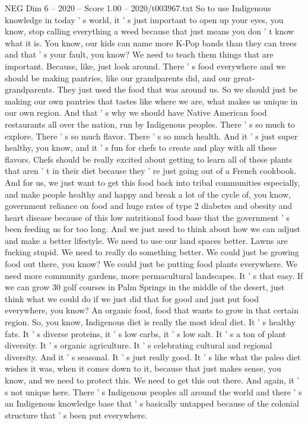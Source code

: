 \begin{textsample}{NEG Dim 6 – 2020 – Score 1.00 – 2020/t003967.txt}
So to use Indigenous knowledge in today ' s world, it ' s just important to open up your eyes, you know, stop calling everything a weed because that just means you don ' t know what it is.
You know, our kids can name more K-Pop bands than they can trees and that ' s your fault, you know?
We need to teach them things that are important.
Because, like, just look around.
There ' s food everywhere and we should be making pantries, like our grandparents did, and our great-grandparents.
They just used the food that was around us.
So we should just be making our own pantries that tastes like where we are, what makes us unique in our own region.
And that ' s why we should have Native American food restaurants all over the nation, run by Indigenous peoples.
There ' s so much to explore.
There ' s so much flavor.
There ' s so much health.
And it ' s just super healthy, you know, and it ' s fun for chefs to create and play with all these flavors.
Chefs should be really excited about getting to learn all of these plants that aren ' t in their diet because they ' re just going out of a French cookbook.
And for us, we just want to get this food back into tribal communities especially, and make people healthy and happy and break a lot of the cycle of, you know, government reliance on food and huge rates of type 2 diabetes and obesity and heart disease because of this low nutritional food base that the government ' s been feeding us for too long.
And we just need to think about how we can adjust and make a better lifestyle.
We need to use our land spaces better.
Lawns are fucking stupid.
We need to really do something better.
We could just be growing food out there, you know?
We could just be putting food plants everywhere.
We need more community gardens, more permacultural landscapes.
It ' s that easy.
If we can grow 30 golf courses in Palm Springs in the middle of the desert, just think what we could do if we just did that for good and just put food everywhere, you know?
An organic food, food that wants to grow in that certain region.
So, you know, Indigenous diet is really the most ideal diet.
It ' s healthy fats.
It ' s diverse proteins, it ' s low carbs, it ' s low salt.
It ' s a ton of plant diversity.
It ' s organic agriculture.
It ' s celebrating cultural and regional diversity.
And it ' s seasonal.
It ' s just really good.
It ' s like what the paleo diet wishes it was, when it comes down to it, because that just makes sense, you know, and we need to protect this.
We need to get this out there.
And again, it ' s not unique here.
There ' s Indigenous peoples all around the world and there ' s an Indigenous knowledge base that ' s basically untapped because of the colonial structure that ' s been put everywhere.

\end{textsample}
